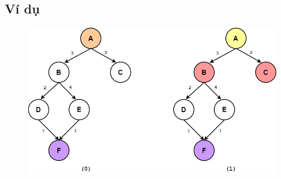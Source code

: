 \subsection{Ví dụ}
\vspace{-0.5cm}
\begin{figure}[H]
    \centering
    \includegraphics[scale=0.5]{pic/UCS2.jpg}
    \label{fig:my_label}
\end{figure}
